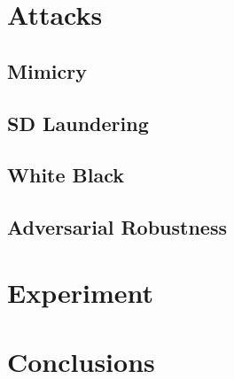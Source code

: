 \documentclass[conference]{IEEEtran} %
\begin{document}
\section{Attacks}
    \subsection{Mimicry}
    \subsection{SD Laundering}
    \subsection{White Black}
    \subsection{Adversarial Robustness}
\section{Experiment}
\section{Conclusions}

\end{document}
